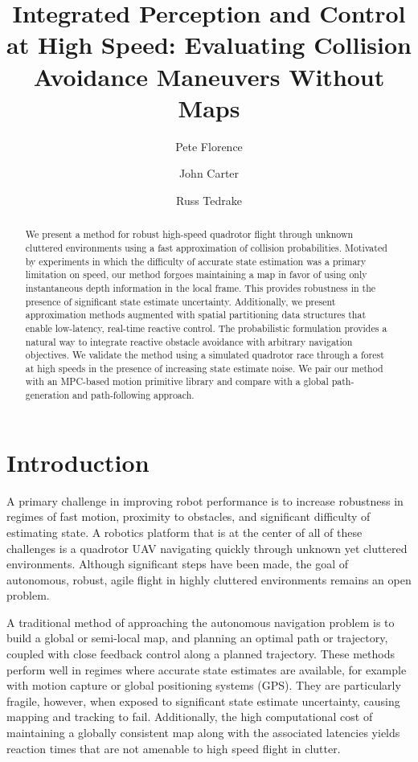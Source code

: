 \documentclass{llncs}
\begin{document}
\title{Integrated Perception and Control at High Speed: Evaluating Collision Avoidance Maneuvers Without Maps}
\author{Pete Florence \and John Carter \and Russ Tedrake }

\maketitle

\begin{abstract}
We present a method for robust high-speed quadrotor flight through unknown cluttered environments using a fast approximation of collision probabilities. Motivated by experiments in which the difficulty of accurate state estimation was a primary limitation on speed, our method forgoes maintaining a map in favor of using only instantaneous depth information in the local frame. This provides robustness in the presence of significant state estimate uncertainty. Additionally, we present approximation methods augmented with spatial partitioning data structures that enable low-latency, real-time reactive control. The probabilistic formulation provides a natural way to integrate reactive obstacle avoidance with arbitrary navigation objectives. We validate the method using a simulated quadrotor race through a forest at high speeds in the presence of increasing state estimate noise. We pair our method with an MPC-based motion primitive library and compare with a global path-generation and path-following approach.
\end{abstract}

\section{Introduction}

A primary challenge in improving robot performance is to increase robustness in regimes of fast motion, proximity to obstacles, and significant difficulty of estimating state.  A robotics platform that is at the center of all of these challenges is a quadrotor UAV navigating quickly through unknown yet cluttered environments.  Although significant steps have been made, the goal of autonomous, robust, agile flight in highly cluttered environments remains an open problem.

A traditional method of approaching the autonomous navigation problem is to build a global or semi-local map, and planning an optimal path or trajectory, coupled with close feedback control along a planned trajectory.  These methods perform well in regimes where accurate state estimates are available, for example with motion capture or global positioning systems (GPS).  They are particularly fragile, however, when exposed to significant state estimate uncertainty, causing mapping and tracking to fail.  Additionally, the high computational cost of maintaining a globally consistent map along with the associated latencies yields reaction times that are not amenable to high speed flight in clutter.
\end{document}
